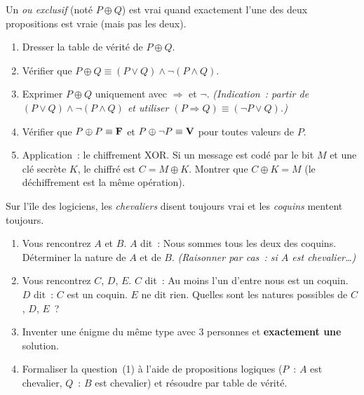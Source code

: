 \begin{challenge}
Un \emph{ou exclusif} (not\'e $P \oplus Q$) est vrai quand exactement
l'une des deux propositions est vraie (mais pas les deux).
\begin{enumerate}
  \item Dresser la table de v\'erit\'e de $P \oplus Q$.
  \item V\'erifier que $P \oplus Q \equiv (P \lor Q) \land \lnot(P \land Q)$.
  \item Exprimer $P \oplus Q$ uniquement avec $\Rightarrow$ et $\lnot$.
        \emph{(Indication~: partir de $(P\lor Q)\land\lnot(P\land Q)$
        et utiliser $(P\Rightarrow Q)\equiv(\lnot P\lor Q)$.)}
  \item V\'erifier que $P \oplus P \equiv \textbf{F}$ et $P \oplus \lnot P \equiv \textbf{V}$
        pour toutes valeurs de $P$.
  \item Application~: le chiffrement XOR. Si un message est cod\'e
        par le bit $M$ et une cl\'e secrète $K$, le chiffr\'e est $C = M \oplus K$.
        Montrer que $C \oplus K = M$ (le d\'echiffrement est la m\^eme op\'eration).
\end{enumerate}
\end{challenge}

\begin{challenge}
Sur l'\^ile des logiciens, les \emph{chevaliers} disent toujours vrai
et les \emph{coquins} mentent toujours.
\begin{enumerate}
  \item Vous rencontrez $A$ et $B$.
        $A$ dit~: \og Nous sommes tous les deux des coquins.\fg
        D\'eterminer la nature de $A$ et de $B$.
        \emph{(Raisonner par cas~: si $A$ est chevalier\ldots)}
  \item Vous rencontrez $C$, $D$, $E$.
        $C$ dit~: \og Au moins l'un d'entre nous est un coquin.\fg
        $D$ dit~: \og$C$ est un coquin.\fg
        $E$ ne dit rien.
        Quelles sont les natures possibles de $C$, $D$, $E$~?
  \item Inventer une \'enigme du m\^eme type avec $3$ personnes
        et \textbf{exactement une} solution.
  \item Formaliser la question~(1) \`a l'aide de propositions logiques
        ($P$~: \og$A$ est chevalier\fg, $Q$~: \og$B$ est chevalier\fg)
        et r\'esoudre par table de v\'erit\'e.
\end{enumerate}
\end{challenge}

